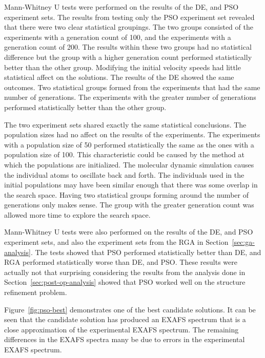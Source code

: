 Mann-Whitney U tests were performed on the results of the DE, and PSO experiment sets. The results from testing only the PSO experiment set revealed that there were two clear statistical groupings. The two groups consisted of the experiments with a generation count of 100, and the experiments with a generation count of 200. The results within these two groups had no statistical difference but the group with a higher generation count performed statistically better than the other group. Modifying the initial velocity speeds had little statistical affect on the solutions. The results of the DE showed the same outcomes. Two statistical groups formed from the experiments that had the same number of generations. The experiments with the greater number of generations performed statistically better than the other group.

The two experiment sets shared exactly the same statistical conclusions. The population sizes had no affect on the results of the experiments. The experiments with a population size of 50 performed statistically the same as the ones with a population size of 100. This characteristic could be caused by the method at which the populations are initialized. The molecular dynamic simulation causes the individual atoms to oscillate back and forth. The individuals used in the initial populations may have been similar enough that there was some overlap in the search space. Having two statistical groups forming around the number of generations only makes sense. The group with the greater generation count was allowed more time to explore the search space.

Mann-Whitney U tests were also performed on the results of the DE, and PSO experiment sets, and also the experiment sets from the RGA in Section~\ref{sec:ga-analysis}. The tests showed that PSO performed statistically better than DE, and RGA performed statistically worse than DE, and PSO. These results were actually not that surprising considering the results from the analysis done in Section~\ref{sec:post-op-analysis} showed that PSO worked well on the structure refinement problem.

Figure~\ref{fig:pso-best} demonstrates one of the best candidate solutions. It can be seen that the candidate solution has produced an EXAFS spectrum that is a close approximation of the experimental EXAFS spectrum. The remaining differences in the EXAFS spectra many be due to errors in the experimental EXAFS spectrum.

